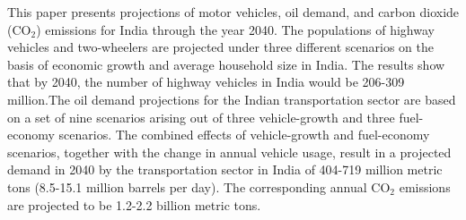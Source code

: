 This paper presents projections of motor vehicles, oil demand, and carbon dioxide (CO$_2$) emissions for India through the year 2040. The populations of highway vehicles and two-wheelers are projected under three different scenarios on the basis of economic growth and average household size in India. The results show that by 2040, the number of highway vehicles in India would be 206-309 million.The oil demand projections for the Indian transportation sector are based on a set of nine scenarios arising out of three vehicle-growth and three fuel-economy scenarios. The combined effects of vehicle-growth and fuel-economy scenarios, together with the change in annual vehicle usage, result in a projected demand in 2040 by the transportation sector in India of 404-719 million metric tons (8.5-15.1 million barrels per day). The corresponding annual CO$_2$ emissions are projected to be 1.2-2.2 billion metric tons.
